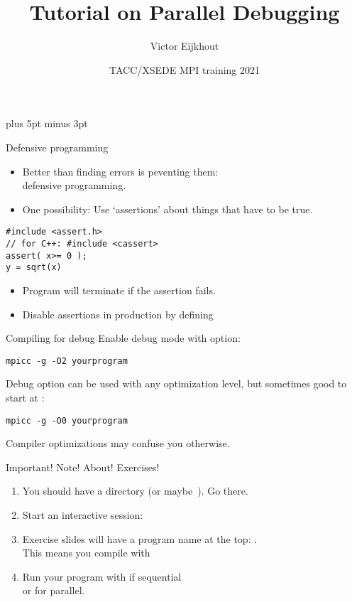 \documentclass[11pt,headernav]{beamer}
\def\Location{}%
\def\Location{TACC/XSEDE training 2021}
\def\Location{}%
\def\courseyear{2021}
\def\Location{TACC HPC Training \courseyear}
\def\Location{TACC/XSEDE MPI training \courseyear}
\begin{document}
\parskip=10pt plus 5pt minus 3pt

\title{Tutorial on Parallel Debugging}
\author{Victor Eijkhout}
\date{\Location}

\begin{frame}
  \titlepage
\end{frame}

\begin{frame}[containsverbatim]{Defensive programming}
  \begin{itemize}
  \item
    Better than finding errors is peventing them:\\
    defensive programming.
    \item One possibility:
      Use `assertions' about things that have to be true.
  \end{itemize}

  \lstset{language=C}
\begin{lstlisting}
#include <assert.h>
// for C++: #include <cassert>
assert( x>= 0 );
y = sqrt(x)
\end{lstlisting}

\begin{itemize}
\item
  Program will terminate if the assertion fails.
\item Disable assertions in production by defining 
\end{itemize}

\end{frame}


\begin{frame}[containsverbatim]{Compiling for debug}
Enable debug mode with  option:
\begin{verbatim}
mpicc -g -O2 yourprogram
\end{verbatim}
Debug option can be used with any optimization level, but
sometimes good to start at :
\begin{verbatim}
mpicc -g -O0 yourprogram
\end{verbatim}
Compiler optimizations may confuse you otherwise.
\end{frame}

\begin{frame}[containsverbatim]{Important! Note! About! Exercises!}
  \begin{enumerate}
  \item You should have a directory  (or maybe~).
    Go there.
  \item Start an interactive session: 
  \item Exercise slides will have a program name at the top: \n{[roots]}.\\
    This means you compile with 
  \item Run your program with  if sequential\\
    or  for parallel.
  \end{enumerate}
\end{frame}
\end{document}
